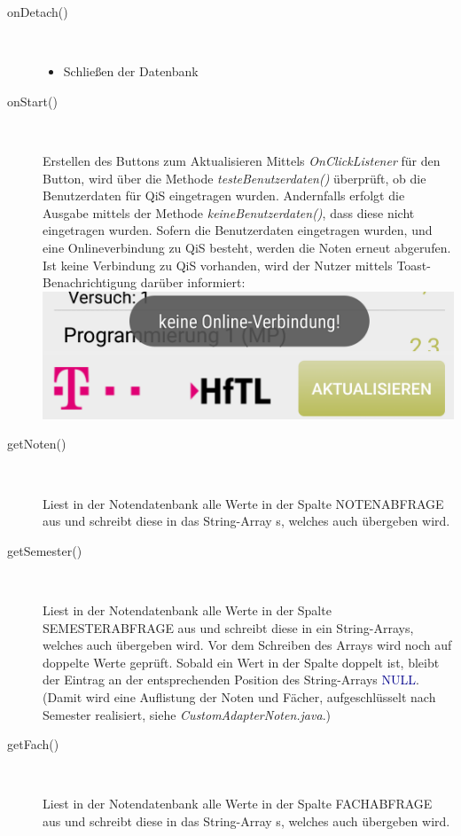 \begin{description}
 
\item[onDetach()]~\par
\begin{itemize}
\item Schließen der Datenbank
\end{itemize}

 
\item[onStart()]~\par
Erstellen des Buttons zum Aktualisieren
Mittels \textit{OnClickListener} für den Button, wird über die Methode \textit{testeBenutzerdaten()} überprüft, ob die Benutzerdaten für QiS eingetragen wurden. Andernfalls erfolgt die Ausgabe mittels der Methode \textit{keineBenutzerdaten()}, dass diese nicht eingetragen wurden. Sofern die Benutzerdaten eingetragen wurden, und eine Onlineverbindung zu QiS besteht, werden die Noten erneut abgerufen. Ist keine Verbindung zu QiS vorhanden, wird der Nutzer mittels Toast-Benachrichtigung darüber informiert:\\
 \includegraphics[scale=0.5]{05_Handbuch/img/Noten_Toast.png}

\item[getNoten()]~\par
Liest in der Notendatenbank alle Werte in der Spalte \textcolor{lila}{NOTENABFRAGE} aus und schreibt diese in das String-Array s, welches auch übergeben wird.
 
\item[getSemester()]~\par
Liest in der Notendatenbank alle Werte in der Spalte \textcolor{lila}{SEMESTERABFRAGE} aus und schreibt diese in ein String-Arrays, welches auch übergeben wird. Vor dem Schreiben des Arrays wird noch auf doppelte Werte geprüft. Sobald ein Wert in der Spalte doppelt ist, bleibt der Eintrag an der entsprechenden Position des String-Arrays \textcolor{darkblue}{NULL}. (Damit wird eine Auflistung der Noten und Fächer, aufgeschlüsselt nach Semester realisiert, siehe \textit{CustomAdapterNoten.java}.)
 
\item[getFach()]~\par
Liest in der Notendatenbank alle Werte in der Spalte \textcolor{lila}{FACHABFRAGE} aus und schreibt diese in das String-Array s, welches auch übergeben wird.


\end{description}
